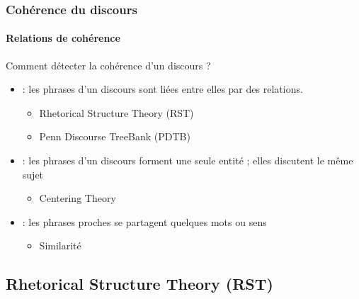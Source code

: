 \documentclass[xcolor=table]{beamer}
\begin{document}
\begin{frame}
	\frametitle{Cohérence du discours}
	\framesubtitle{Relations de cohérence}
	
	Comment détecter la cohérence d'un discours ?
	\begin{itemize}
		\item {} : les phrases d'un discours sont liées entre elles par des relations. 
		\begin{itemize}
			\item Rhetorical Structure Theory (RST) 
			\item Penn Discourse TreeBank (PDTB)
		\end{itemize}
		\item {} : les phrases d'un discours forment une seule entité ; elles discutent le même sujet
		\begin{itemize}
			\item Centering Theory 
		\end{itemize}
		\item {} : les phrases proches se partagent quelques mots ou sens 
		\begin{itemize}
			\item Similarité
		\end{itemize}
	\end{itemize}
	
\end{frame}

\subsection{Rhetorical Structure Theory (RST)}
\end{document}
